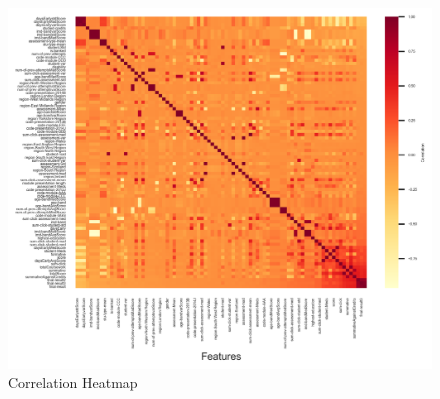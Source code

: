 \documentclass[11pt, a4paper]{article}
\begin{document}
\begin{figure}[H]
	\centering
	\includegraphics[width=0.95\linewidth]{heatmap.png} 
	\caption{Correlation Heatmap}
	\label{fig:heatmap}
\end{figure}
\end{document}
